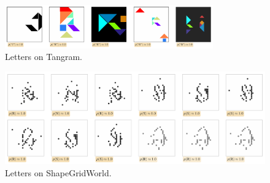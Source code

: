 \begin{figure}[h]
    \centering
    \includegraphics[width=0.8\textwidth]{images/curation_letters.pdf}
    \caption{Letters on Tangram.}
    \label{fig:curation_letters}
\end{figure}

\begin{figure}
    \centering
    \includegraphics[width=\textwidth]{images/sgw_reruns.pdf}
    \caption{Letters on ShapeGridWorld.}
    \label{fig:sgw-trajectories}
\end{figure}
